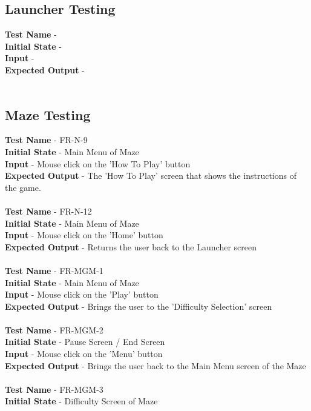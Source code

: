 \documentclass[12pt, titlepage]{article}
\begin{document}
\subsection{Launcher Testing}

\textbf{Test Name} - \\
\textbf{Initial State} - \\
\textbf{Input} - \\
\textbf{Expected Output} - \\ \\ 

\subsection{Maze Testing}

\textbf{Test Name} - FR-N-9\\
\textbf{Initial State} - Main Menu of Maze\\
\textbf{Input} - Mouse click on the 'How To Play' button\\
\textbf{Expected Output} - The 'How To Play' screen that shows the instructions of the game.\\ \\
\textbf{Test Name} - FR-N-12\\
\textbf{Initial State} - Main Menu of Maze\\
\textbf{Input} - Mouse click on the 'Home' button\\
\textbf{Expected Output} - Returns the user back to the Launcher screen\\ \\
\textbf{Test Name} - FR-MGM-1\\
\textbf{Initial State} - Main Menu of Maze\\
\textbf{Input} - Mouse click on the 'Play' button\\
\textbf{Expected Output} - Brings the user to the 'Difficulty Selection' screen\\ \\
\textbf{Test Name} - FR-MGM-2\\
\textbf{Initial State} - Pause Screen / End Screen\\
\textbf{Input} - Mouse click on the 'Menu' button\\
\textbf{Expected Output} - Brings the user back to the Main Menu screen of the Maze \\ \\
\textbf{Test Name} - FR-MGM-3\\
\textbf{Initial State} - Difficulty Screen of Maze\\
\end{document}

